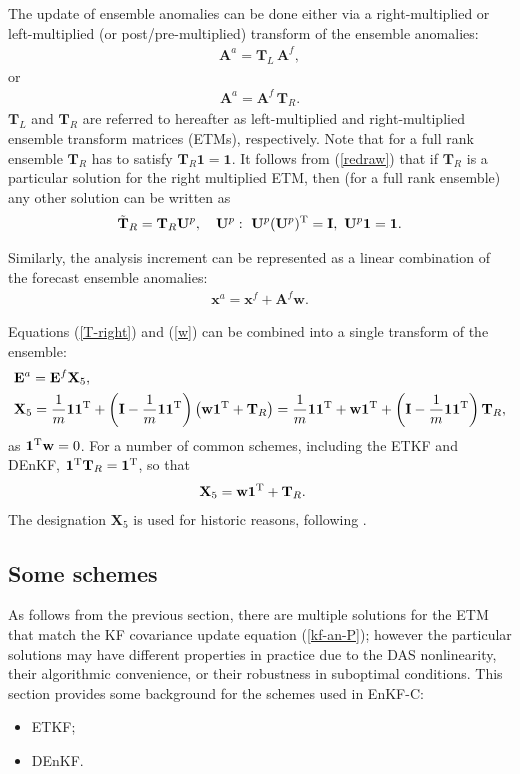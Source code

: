 \documentclass[11pt]{report}
\newcommand{\mb} {\mathbf}
\newcommand{\T}{^{\tiny \mathrm T}}
\begin{document}
The update of ensemble anomalies can be done either via a right-multiplied or left-multiplied (or post/pre-multiplied) transform of the ensemble anomalies:
\begin{align}
  \label{T-left}
  \mb A^a = \mb T_L \,\mb A^f,
\end{align}
or
\begin{align}
  \label{T-right}
  \mb A^a = \mb A^f \, \mb T_R.
\end{align}
$\mb T_L$ and $\mb T_R$ are referred to hereafter as left-multiplied and right-multiplied ensemble transform matrices (ETMs), respectively.
Note that for a full rank ensemble $\mb T_R$ has to satisfy $\mb T_R \mb 1 = \mb 1$.
It follows from (\ref{redraw}) that if $\mb T_R$ is a particular solution for the right multiplied ETM, then (for a full rank ensemble) any other solution can be written as
\begin{align}
  \tilde{\mb T}_R = \mb T_R \mb U^p, \quad \mb U^p:\ \mb U^p (\mb U^p)\T = \mb I,\ \mb U^p \mb 1 = \mb 1.
\end{align}

Similarly, the analysis increment can be represented as a linear combination of the forecast ensemble anomalies:
\begin{align}
  \label{w}
  \mb x^a = \mb x^f + \mb A^f \mb w.
\end{align}

Equations (\ref{T-right}) and (\ref{w}) can be combined into a single transform of the ensemble:
\begin{align}
  \label{x5-def}
  & \mb E^a = \mb E^f \mb X_5,\\
  & \mb X_5 = \frac{1}{m} \mb 1 \mb 1\T + \left( \mb I - \frac{1}{m} \mb 1 \mb 1\T\right) \left( \mb w \mb 1\T + \mb T_R\right)
  = \frac{1}{m} \mb 1 \mb 1\T + \mb w \mb 1\T + \left( \mb I - \frac{1}{m} \mb 1 \mb 1\T \right) \mb T_R,
\end{align}
as $\mb 1\T \mb w = 0$. 
For a number of common schemes, including the ETKF and DEnKF, $\mb 1\T \mb T_R = \mb 1\T$, so that
\begin{align}
  \label{x5}
  & \mb X_5 = \mb w \mb 1\T + \mb T_R.
\end{align}
The designation $\mb X_5$ is used for historic reasons, following \citet{eve03a}.

\subsection{Some schemes}

As follows from the previous section, there are multiple solutions for the ETM that match the KF covariance update equation (\ref{kf-an-P}); however the particular solutions may have different properties in practice due to the DAS nonlinearity, their algorithmic convenience, or their robustness in suboptimal conditions.
This section provides some background for the schemes used in EnKF-C:
\begin{itemize}
\item ETKF;
\item DEnKF.
\end{itemize}
\end{document}
